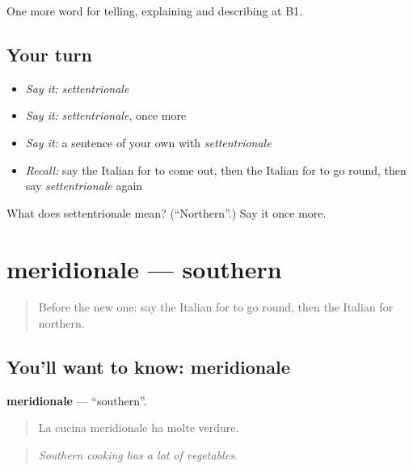 \begin{grammarlens}[title={What you've built}]
One more word for telling, explaining and describing at B1.
\end{grammarlens}

\subsection*{Your turn}
\begin{itemize}
\raggedright
  \item \emph{Say it:} \emph{settentrionale}
  \item \emph{Say it:} \emph{settentrionale}, once more
  \item \emph{Say it:} a sentence of your own with \emph{settentrionale}
  \item \emph{Recall:} say the Italian for to come out, then the Italian for to go round, then say \emph{settentrionale} again
\end{itemize}

\begin{tcolorbox}[breakable,colback=teal!4,colframe=teal!35!black,title={Before you move on}]
What does settentrionale mean? (\textquotedblleft{}Northern\textquotedblright{}.) Say it once more.
\end{tcolorbox}
\section[meridionale]{meridionale — southern}

\label{lesson:IT-C443-meridionale}



\begin{quote}
Before the new one: say the Italian for to go round, then the Italian for northern.
\end{quote}

\subsection*{You'll want to know: meridionale}
\textbf{meridionale} — \textquotedblleft{}southern\textquotedblright{}.

\begin{quote}
La cucina meridionale ha molte verdure.
\end{quote}

\begin{quote}
\emph{Southern cooking has a lot of vegetables.}
\end{quote}

